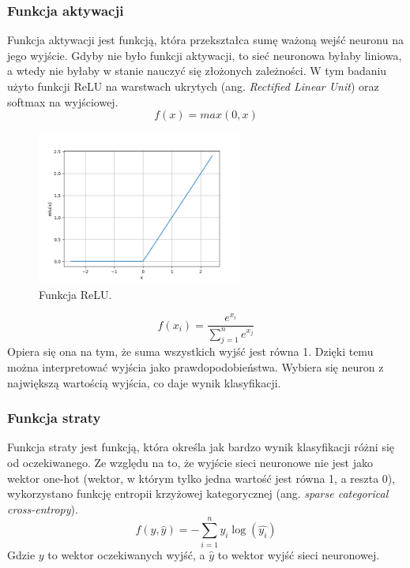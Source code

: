 \subsubsection{Funkcja aktywacji}\label{subsubsec:funkcja_aktywacji}
Funkcja aktywacji jest funkcją, która przekształca sumę ważoną wejść neuronu na jego wyjście.
Gdyby nie było funkcji aktywacji, to sieć neuronowa byłaby liniowa, a wtedy nie byłaby w stanie nauczyć się złożonych zależności.
W tym badaniu użyto funkcji ReLU na warstwach ukrytych (ang. \textit{Rectified Linear Unit}) oraz softmax na wyjściowej.
\begin{equation}
    f(x) = max(0, x)
\end{equation}
\begin{figure}[H]
    \centering
    \includegraphics[width=0.6\textwidth]{img/relu.png}
    \caption{Funkcja ReLU.}
    \label{fig:relu}
\end{figure}
\begin{equation}
    f(x_i) = \frac{e^{x_i}}{\sum_{j=1}^{n} e^{x_j}}
\end{equation}
Opiera się ona na tym, że suma wszystkich wyjść jest równa 1. Dzięki temu można interpretować wyjścia jako prawdopodobieństwa.
Wybiera się neuron z największą wartością wyjścia, co daje wynik klasyfikacji.
\subsubsection{Funkcja straty}\label{subsubsec:funkcja_straty}
Funkcja straty jest funkcją, która określa jak bardzo wynik klasyfikacji różni się od oczekiwanego.
Ze względu na to, że wyjście sieci neuronowe nie jest jako wektor one-hot
(wektor, w którym tylko jedna wartość jest równa 1, a reszta 0),
wykorzystano funkcję entropii krzyżowej kategorycznej (ang. \textit{sparse categorical cross-entropy}).
\begin{equation}
    f(y, \hat{y}) = -\sum_{i=1}^{n} y_i \log(\hat{y_i})
\end{equation}
Gdzie $y$ to wektor oczekiwanych wyjść, a $\hat{y}$ to wektor wyjść sieci neuronowej.
